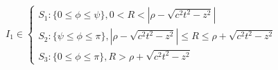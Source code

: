 %
%
%
%
\begin{equation*} \begin{aligned}
I_1 \in \begin{cases}
S_1: \{ 0 \leq \phi \leq \psi \}, 0 < R < 
\left| \rho - \sqrt{c^2 t^2 - z^2} \right| \\
S_2: \{ \psi \leq \phi \leq \pi \}, \left| \rho - \sqrt{c^2 t^2 - z^2} \right| \leq 
R \leq \rho + \sqrt{c^2 t^2 - z^2} \\
S_3: \{ 0 \leq \phi \leq \pi \}, R > \rho + \sqrt{c^2 t^2 - z^2}
\end{cases} 
\end{aligned} \end{equation*}
